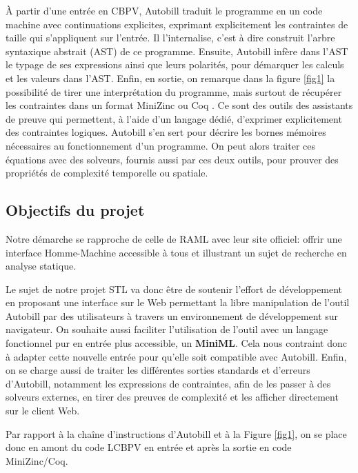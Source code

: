 \documentclass[12pt]{article}
\begin{document}
À partir d'une entrée en CBPV, Autobill traduit le programme en un code
machine avec continuations explicites, exprimant explicitement les
contraintes de taille qui s'appliquent sur l'entrée. Il l'internalise,
c'est à dire construit l'arbre syntaxique abstrait (AST) de ce
programme. Ensuite, Autobill infère dans l'AST le typage de ses
expressions ainsi que leurs polarités, pour démarquer les calculs et les
valeurs dans l'AST. Enfin, en sortie, on remarque dans la figure
\ref{fig1} la possibilité de tirer une interprétation du programme, mais
surtout de récupérer les contraintes dans un format MiniZinc
\cite{minizinc} ou Coq
\cite{coq}. Ce sont des outils des assistants
de preuve qui permettent, à l'aide d'un langage dédié, d'exprimer
explicitement des contraintes logiques. Autobill s'en sert pour décrire
les bornes mémoires nécessaires au fonctionnement d'un programme. On
peut alors traiter ces équations avec des solveurs, fournis aussi par
ces deux outils, pour prouver des propriétés de complexité temporelle ou
spatiale.

\newpage

\subsection{Objectifs du projet}\label{objectifs-du-projet}

Notre démarche se rapproche de celle de RAML
\cite{RAML} avec leur site officiel: offrir
une interface Homme-Machine accessible à tous et illustrant un sujet de
recherche en analyse statique.

Le sujet de notre projet STL va donc être de soutenir l'effort de
développement en proposant une interface sur le Web permettant la libre
manipulation de l'outil Autobill par des utilisateurs à travers un
environnement de développement sur navigateur. On souhaite
aussi faciliter l'utilisation de l'outil avec un langage fonctionnel pur
en entrée plus accessible, un \textbf{MiniML}. Cela nous contraint donc
à adapter cette nouvelle entrée pour qu'elle soit compatible avec
Autobill. Enfin, on se charge aussi de traiter les différentes sorties
standards et d'erreurs d'Autobill, notamment les expressions de
contraintes, afin de les passer à des solveurs externes, en tirer des
preuves de complexité et les afficher directement sur le client Web.

Par rapport à la chaîne d'instructions d'Autobill et à la Figure
\ref{fig1}, on se place donc en amont du code LCBPV en entrée et après
la sortie en code MiniZinc/Coq.
\end{document}
